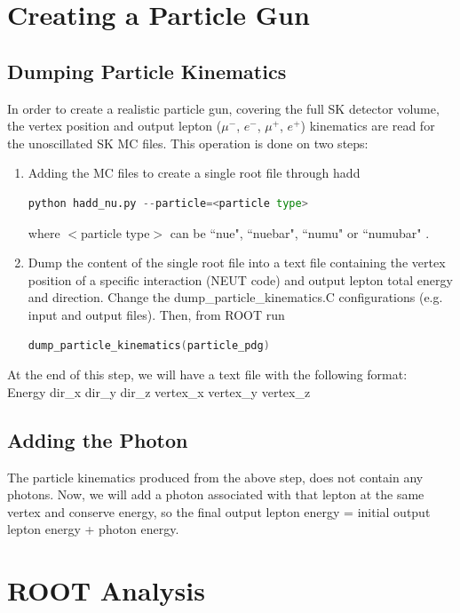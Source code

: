 \documentclass[12pt]{report}
\begin{document}
\section{Creating a Particle Gun}
\subsection{Dumping Particle Kinematics}
In order to create a realistic particle gun, covering the full SK detector volume, the vertex position and output lepton ($\mu^-$, $e^-$, $\mu^+$, $e^+$) kinematics are read for the unoscillated SK MC files. This operation is done on two steps:\\
\begin{enumerate}
	\item Adding the MC files to create a single root file through hadd\\
\begin{lstlisting}[language=Python, caption=Combining MC ROOT files]
python hadd_nu.py --particle=<particle type>							
\end{lstlisting}
where $<$particle type$>$ can  be ``nue", ``nuebar", ``numu" or ``numubar" .
	\item Dump the content of the single root file into a text file containing the vertex position of a specific interaction (NEUT code) and output lepton total energy and direction. 
Change the dump\_particle\_kinematics.C configurations (e.g. input and output files). Then, from ROOT run
\begin{lstlisting}[language=C++, caption=Dumping Particle Kinematics]
dump_particle_kinematics(particle_pdg)	
\end{lstlisting}	
\end{enumerate}
At the end of this step, we will have a text file with the following format:\\
Energy dir\_x dir\_y dir\_z vertex\_x vertex\_y vertex\_z 	
\subsection{Adding the Photon}
The particle kinematics produced from the above step, does not contain any photons. Now, we will add a photon associated with that lepton at the same vertex and conserve energy, so the final output lepton energy = initial output lepton energy + photon energy. 
\section{ROOT Analysis}
\end{document}
